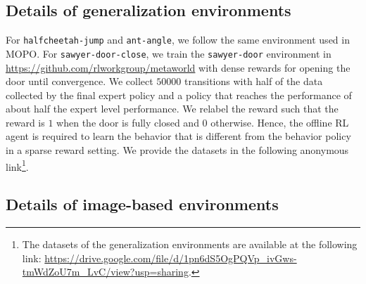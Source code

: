 \begin{table}[ht]
    \centering
    \scriptsize
    \caption{\footnotesize We include our automatic hyperparameter selection rule of $f$ on the medium datasets in the hopper and walker2d environments from D4RL. We follow the same convention defined in Table~\ref{tab:beta_selection} and find that our automatic selection rule can effectively select $f$ offline.}
    \label{tab:f_selection}
\end{table}

\subsection{Details of generalization environments}
\label{app:ood_details}

For \texttt{halfcheetah-jump} and \texttt{ant-angle}, we follow the same environment used in MOPO. For \texttt{sawyer-door-close}, we train the \texttt{sawyer-door} environment in \url{https://github.com/rlworkgroup/metaworld} with dense rewards for opening the door until convergence. We collect $50000$ transitions with half of the data collected by the final expert policy and a policy that reaches the performance of about half the expert level performance. We relabel the reward such that the reward is $1$ when the door is fully closed and $0$ otherwise. Hence, the offline RL agent is required to learn the behavior that is different from the behavior policy in a sparse reward setting. We provide the datasets in the following anonymous link\footnote{The datasets of the generalization environments are available at the following link: \url{https://drive.google.com/file/d/1pn6dS5OgPQVp_ivGws-tmWdZoU7m_LvC/view?usp=sharing}.}.

\subsection{Details of image-based environments}
\label{app:image_details}

